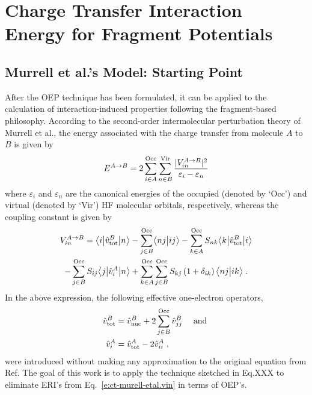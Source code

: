 \section{\label{s:34r}Charge Transfer Interaction Energy for Fragment Potentials}

\subsection{\label{s:34rg} Murrell et al.'s Model: Starting Point}

After the OEP technique has been formulated, it can be applied 
to the calculation of interaction\hyp{}induced properties following the
fragment\hyp{}based philosophy. 
According to the second\hyp{}order intermolecular perturbation theory of Murrell et al.,
the energy associated with the charge transfer from molecule $A$ to $B$ is given by
%
\begin{equation} \label{e:ct-murell-etal.e}
 E^{A\rightarrow B} = 2 \sum_{i\in A}^{\rm Occ} \sum_{n\in B}^{\rm Vir} 
  \frac{\vert V^{A\rightarrow B}_{in} \vert^2 }{\varepsilon_i - \varepsilon_n}
\end{equation}
%
%
where $\varepsilon_i$ and $\varepsilon_n$ are the canonical energies
of the occupied (denoted by `Occ') and virtual (denoted by `Vir') 
HF molecular orbitals, respectively,
whereas the coupling constant is given by
%
\begin{multline} \label{e:ct-murell-etal.vin}
 V^{A\rightarrow B}_{in} = 
        \bigl\langle {i} \bigl\lvert {\hat{v}^B_{\rm tot} } \bigl\lvert {n} \bigr\rangle 
      - \sum_{j\in B}^{\rm Occ} \bigl\langle {nj} \bigl\lvert {ij} \bigr\rangle 
      - \sum_{k\in A}^{\rm Occ} S_{nk} \bigl\langle {k} \bigl\lvert {\hat{v}^B_{\rm tot} } \bigl\lvert {i} \bigr\rangle \\
      - \sum_{j\in B}^{\rm Occ} S_{ij} \bigl\langle {j} \bigl\lvert {\hat{v}^A_{i} } \bigl\lvert {n} \bigr\rangle  
     + \sum_{k\in A}^{\rm Occ} \sum_{j\in B}^{\rm Occ}  
        S_{kj} \left(1+\delta_{ik}\right) \bigl\langle {nj} \bigl\lvert {ik} \bigr\rangle \;.
\end{multline}
%
In the above expression, the following effective one\hyp{}electron operators,
%
\begin{subequations} 
\begin{align} \label{e:ct-murell-etal.vtot-vi}
 \hat{v}^B_{\rm tot} &= \hat{v}^B_{\rm nuc} + 2\sum_{j\in B}^{\rm Occ} \hat{v}^B_{jj} \quad\text{ and }\\ 
 \hat{v}^A_{i      } &= \hat{v}^A_{\rm tot} - 2\hat{v}^A_{ii} \;,
\end{align}
\end{subequations}
%
were introduced without making any approximation to the original equation
from Ref. 
The goal of this work is to apply the technique sketched in Eq.XXX
to eliminate ERI's from Eq.~\eqref{e:ct-murell-etal.vin} in terms of OEP's.

